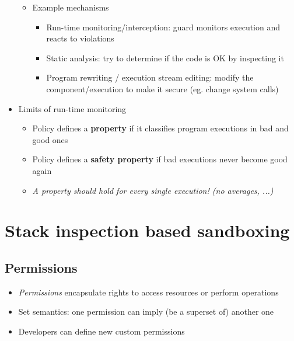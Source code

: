 \documentclass[12pt,titlepage,a4paper]{report}
\begin{document}
\begin{itemize}
\begin{itemize}
\begin{itemize}
					\end{itemize}
					\item Example mechanisms
					\begin{itemize}
						\item Run-time monitoring/interception: guard monitors execution and reacts to violations
						\item Static analysis: try to determine if the code is OK by inspecting it
						\item Program rewriting / execution stream editing: modify the component/execution to make it secure (eg. change system calls)
					\end{itemize}
				\end{itemize}
				\item Limits of run-time monitoring
				\begin{itemize}
					\item Policy defines a \textbf{property} if it classifies program executions in bad and good ones
					\item Policy defines a \textbf{safety property} if bad executions never become good again
					\item[\textrightarrow] \emph{A property should hold for every single execution! (no averages, ...)}
				\end{itemize}
			\end{itemize}

		\section{Stack inspection based sandboxing}
			\subsection{Permissions}
			\begin{itemize}
				\item \textit{Permissions} encapsulate rights to access resources or perform operations
				\item Set semantics: one permission can imply (be a superset of) another one
				\item Developers can define new custom permissions
			\end{itemize}
\end{document}
